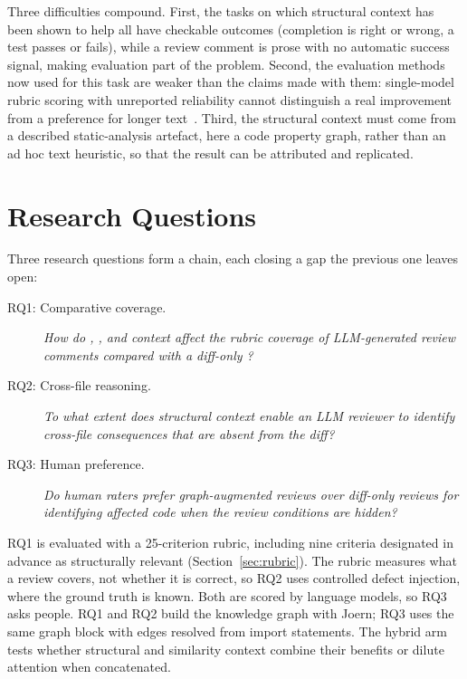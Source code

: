 Three difficulties compound. First, the tasks on which structural context has
been shown to help all have checkable outcomes (completion is right or
wrong, a test passes or fails), while a review comment is prose with no
automatic success signal, making evaluation part of the problem. Second, the
evaluation methods now used for this task are weaker than the claims made with
them: single-model rubric scoring with unreported reliability cannot
distinguish a real improvement from a preference for longer
text~\cite{zheng2023judging}. Third, the structural context must come from
a described static-analysis artefact, here a code property graph, rather
than an ad hoc text heuristic, so that the result can be attributed and
replicated.

\section{Research Questions}
\label{sec:intro-rqs}

Three research questions form a chain, each closing a gap the previous one
leaves open:

\begin{description}
    \item[RQ1: Comparative coverage.] \textit{How do \kg{}, \rag{}, and
        \hybrid{} context affect the rubric coverage of LLM-generated review
        comments compared with a diff-only \baseline{}?}
    \item[RQ2: Cross-file reasoning.] \textit{To what extent does
        structural context enable an LLM reviewer to identify cross-file
        consequences that are absent from the diff?}
    \item[RQ3: Human preference.] \textit{Do human raters prefer
        graph-augmented reviews over diff-only reviews for identifying affected
        code when the review conditions are hidden?}
\end{description}

RQ1 is evaluated with a 25-criterion rubric, including nine criteria
designated in advance as structurally relevant (Section~\ref{sec:rubric}).
The rubric measures what a review covers, not whether it is correct, so
RQ2 uses controlled defect injection, where the ground truth is known.
Both are scored by language models, so RQ3 asks people. RQ1 and RQ2 build the
knowledge graph with Joern; RQ3 uses the same graph block with edges
resolved from import statements. The hybrid arm tests whether structural and similarity context
combine their benefits or dilute attention when concatenated.


